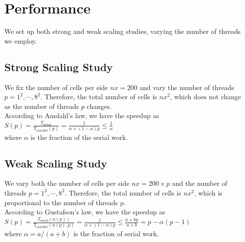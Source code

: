 \documentclass[12pt]{article}
\numberwithin{equation}{section}
\begin{document}
\section{Performance}

\normalsize
We set up both strong and weak scaling studies, varying the number of threads we employ.

\subsection{Strong Scaling Study}

We fix the number of cells per side $nx = 200$ and vary the number of threads $p = 1^2, \cdots, 8^2$. Therefore, the total number of cells is $nx^2$, which does not change as the number of threads $p$ changes.
\\
According to Amdahl's law, we have the speedup as
\\
$S(p) = \frac{T_\textrm{serial}}{\textrm{T}_\textrm{parallel}(p)} = \frac{1}{\alpha + (1-\alpha)p} \leq \frac{1}{\alpha}$
\\
where $\alpha$ is the fraction of the serial work.

\subsection{Weak Scaling Study}

We vary both the number of cells per side $nx = 200 \times p$ and the number of threads $p = 1^2, \cdots, 8^2$. Therefore, the total number of cells is $nx^2$, which is proportional to the number of threads $p$.
\\
According to Gustafson's law, we have the speedup as
\\
$S(p) = \frac{T_\textrm{serial}(n(p))}{\textrm{T}_\textrm{parallel}(n(p), p)} = \frac{1}{\alpha + (1-\alpha)p} \leq \frac{a + bp}{a + b} = p - \alpha(p-1)$
\\
where $\alpha=a/(a+b)$ is the fraction of serial work.
\end{document}
